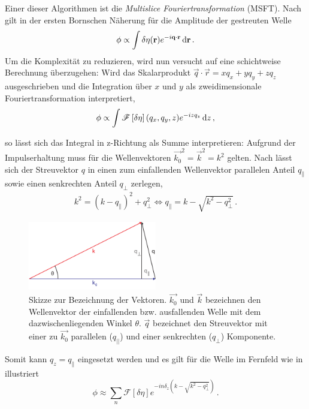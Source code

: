 Einer dieser Algorithmen ist die \textit{Multislice Fouriertransformation} (MSFT). Nach  gilt in der ersten Bornschen Näherung für die Amplitude der gestreuten Welle
\begin{equation}
	\phi\propto\int \delta\eta(\vec{r}) e^{-i\vec{q}\cdot \vec{r}} \dif \vec{r} \, .
\end{equation}
Um die Komplexität zu reduzieren, wird nun versucht auf eine schichtweise Berechnung überzugehen: Wird das Skalarprodukt $\vec{q}\cdot \vec{r}=xq_x+yq_y+zq_z$ ausgeschrieben und die Integration über $x$ und $y$ als zweidimensionale Fouriertransformation interpretiert,
\begin{equation}
	\phi\propto\int \mathscr{F}\left[\delta\eta\right](q_x,q_y,z) e^{-izq_z} \dif z \, ,
\end{equation}

so lässt sich das Integral in z-Richtung als Summe interpretieren:
Aufgrund der Impulserhaltung muss für die Wellenvektoren $\vec{k_0}^2=\vec{k}^2=k^2$ gelten. Nach   lässt sich der Streuvektor $q$ in einen zum einfallenden Wellenvektor parallelen Anteil $q_\parallel$ sowie einen senkrechten Anteil $q_\perp$ zerlegen,
\begin{align}
	k^2=(k-q_\parallel)^2+q_{\perp}^2                  
	\Leftrightarrow q_\parallel=k-\sqrt{k^2-q_\perp^2} \,.
\end{align}
\begin{figure}
	\centering
	\includegraphics[width=0.5\textwidth]{images/vec_msft.pdf}
	\caption[Vektoren bei MSFT]{Skizze zur Bezeichnung der Vektoren. $\vec{k_{0}}$ und $\vec{k}$ bezeichnen den Wellenvektor der einfallenden bzw. ausfallenden Welle mit dem dazwischenliegenden Winkel $\theta$. $\vec{q}$ bezeichnet den Streuvektor mit einer zu $\vec{k_{0}}$ parallelen ($q_{||}$) und einer senkrechten ($q_\perp$) Komponente.}
	\label{fig:vec_msft}
\end{figure} 

Somit kann $q_z=q_\parallel$ eingesetzt werden und es gilt für die Welle im Fernfeld wie in  illustriert
\begin{equation}
	\label{eq:msft}
	\phi\approx\sum_n{\mathscr{F}\left[\delta\eta\right] e^{-in\delta_z\left(k-\sqrt{k^2-q_\perp^2}\right) }} \, .
\end{equation}

